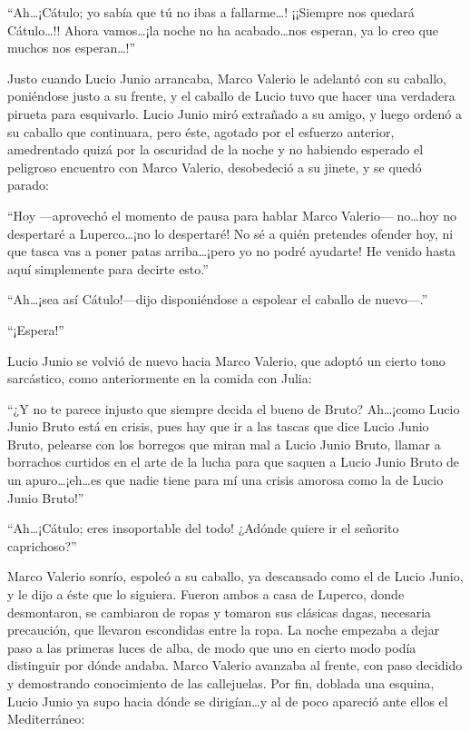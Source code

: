 \documentclass[11pt,openany]{book}
\begin{document}
“Ah\dots ¡Cátulo; yo sabía que tú no ibas a fallarme\dots! ¡¡Siempre nos quedará Cátulo\dots!! Ahora vamos\dots ¡la noche no ha acabado\dots nos esperan, ya lo creo que muchos nos esperan\dots!” 

Justo cuando Lucio Junio arrancaba, Marco Valerio le adelantó con su caballo, poniéndose justo a su frente, y el caballo de Lucio tuvo que hacer una verdadera pirueta para esquivarlo. Lucio Junio miró extrañado a su amigo, y luego ordenó a su caballo que continuara, pero éste, agotado por el esfuerzo anterior, amedrentado quizá por la oscuridad de la noche y no habiendo esperado el peligroso encuentro con Marco Valerio, desobedeció a su jinete, y se quedó parado: 

“Hoy —aprovechó el momento de pausa para hablar Marco Valerio— no\dots hoy no despertaré a Luperco\dots ¡no lo despertaré! No sé a quién pretendes ofender hoy, ni que tasca vas a poner patas arriba\dots ¡pero yo no podré ayudarte! He venido hasta aquí simplemente para decirte esto.” 

“Ah\dots ¡sea así Cátulo!—dijo disponiéndose a espolear el caballo de nuevo—.” 

“¡Espera!” 

Lucio Junio se volvió de nuevo hacia Marco Valerio, que adoptó un cierto tono sarcástico, como anteriormente en la comida con Julia: 

“¿Y no te parece injusto que siempre decida el bueno de Bruto? Ah\dots ¡como Lucio Junio Bruto está en crisis, pues hay que ir a las tascas que dice Lucio Junio Bruto, pelearse con los borregos que miran mal a Lucio Junio Bruto, llamar a borrachos curtidos en el arte de la lucha para que saquen a Lucio Junio Bruto de un apuro\dots ¡eh\dots es que nadie tiene para mí una crisis amorosa como la de Lucio Junio Bruto!” 

“Ah\dots ¡Cátulo; eres insoportable del todo! ¿Adónde quiere ir el señorito caprichoso?” 

Marco Valerio sonrío, espoleó a su caballo, ya descansado como el de Lucio Junio, y le dijo a éste que lo siguiera. Fueron ambos a casa de Luperco, donde desmontaron, se cambiaron de ropas y tomaron sus clásicas dagas, necesaria precaución, que llevaron escondidas entre la ropa. La noche empezaba a dejar paso a las primeras luces de alba, de modo que uno en cierto modo podía distinguir por dónde andaba. Marco Valerio avanzaba al frente, con paso decidido y demostrando conocimiento de las callejuelas. Por fin, doblada una esquina, Lucio Junio ya supo hacia dónde se dirigían\dots y al de poco apareció ante ellos el Mediterráneo: 
\end{document}
